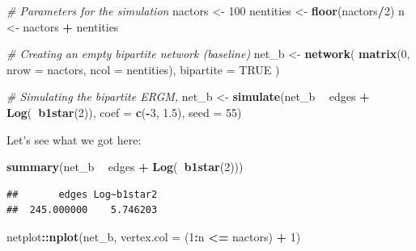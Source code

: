 \documentclass[]{book}
\newenvironment{Shaded}{\begin{snugshade}}{\end{snugshade}}
\newcommand{\CommentTok}[1]{\textcolor[rgb]{0.56,0.35,0.01}{\textit{#1}}}
\newcommand{\DataTypeTok}[1]{\textcolor[rgb]{0.13,0.29,0.53}{#1}}
\newcommand{\DecValTok}[1]{\textcolor[rgb]{0.00,0.00,0.81}{#1}}
\newcommand{\FloatTok}[1]{\textcolor[rgb]{0.00,0.00,0.81}{#1}}
\newcommand{\KeywordTok}[1]{\textcolor[rgb]{0.13,0.29,0.53}{\textbf{#1}}}
\newcommand{\NormalTok}[1]{#1}
\newcommand{\OperatorTok}[1]{\textcolor[rgb]{0.81,0.36,0.00}{\textbf{#1}}}
\newcommand{\OtherTok}[1]{\textcolor[rgb]{0.56,0.35,0.01}{#1}}
\newcommand{\StringTok}[1]{\textcolor[rgb]{0.31,0.60,0.02}{#1}}
\begin{document}
\begin{Shaded}
\begin{Highlighting}[]
\CommentTok{# Parameters for the simulation}
\NormalTok{nactors   <-}\StringTok{ }\DecValTok{100}
\NormalTok{nentities <-}\StringTok{ }\KeywordTok{floor}\NormalTok{(nactors}\OperatorTok{/}\DecValTok{2}\NormalTok{)}
\NormalTok{n         <-}\StringTok{ }\NormalTok{nactors }\OperatorTok{+}\StringTok{ }\NormalTok{nentities}

\CommentTok{# Creating an empty bipartite network (baseline)}
\NormalTok{net_b <-}\StringTok{ }\KeywordTok{network}\NormalTok{(}
  \KeywordTok{matrix}\NormalTok{(}\DecValTok{0}\NormalTok{, }\DataTypeTok{nrow =}\NormalTok{ nactors, }\DataTypeTok{ncol =}\NormalTok{ nentities), }\DataTypeTok{bipartite =} \OtherTok{TRUE}
\NormalTok{)}

\CommentTok{# Simulating the bipartite ERGM,}
\NormalTok{net_b <-}\StringTok{ }\KeywordTok{simulate}\NormalTok{(net_b }\OperatorTok{~}\StringTok{ }\NormalTok{edges }\OperatorTok{+}\StringTok{ }\KeywordTok{Log}\NormalTok{(}\OperatorTok{~}\KeywordTok{b1star}\NormalTok{(}\DecValTok{2}\NormalTok{)), }\DataTypeTok{coef =} \KeywordTok{c}\NormalTok{(}\OperatorTok{-}\DecValTok{3}\NormalTok{, }\FloatTok{1.5}\NormalTok{), }\DataTypeTok{seed =} \DecValTok{55}\NormalTok{)}
\end{Highlighting}
\end{Shaded}

Let's see what we got here:

\begin{Shaded}
\begin{Highlighting}[]
\KeywordTok{summary}\NormalTok{(net_b }\OperatorTok{~}\StringTok{ }\NormalTok{edges }\OperatorTok{+}\StringTok{ }\KeywordTok{Log}\NormalTok{(}\OperatorTok{~}\KeywordTok{b1star}\NormalTok{(}\DecValTok{2}\NormalTok{)))}
\end{Highlighting}
\end{Shaded}

\begin{verbatim}
##       edges Log~b1star2 
##  245.000000    5.746203
\end{verbatim}

\begin{Shaded}
\begin{Highlighting}[]
\NormalTok{netplot}\OperatorTok{::}\KeywordTok{nplot}\NormalTok{(net_b, }\DataTypeTok{vertex.col =}\NormalTok{ (}\DecValTok{1}\OperatorTok{:}\NormalTok{n }\OperatorTok{<=}\StringTok{ }\NormalTok{nactors) }\OperatorTok{+}\StringTok{ }\DecValTok{1}\NormalTok{)}
\end{Highlighting}
\end{Shaded}
\end{document}
